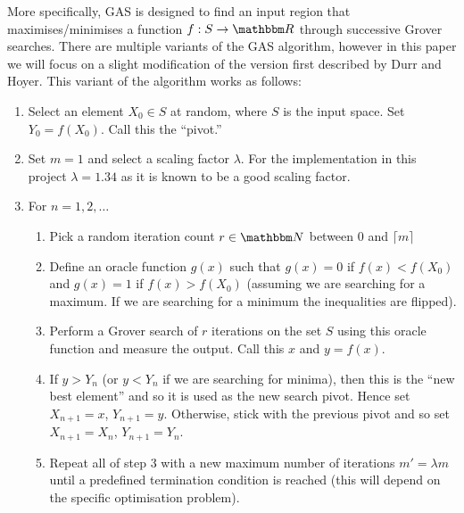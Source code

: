 \documentclass{article}[11pt]
\begin{document}
More specifically, GAS is designed to find an input region that maximises/minimises a function $f:S\rightarrow\mathbbm R$ through successive Grover searches. There are multiple variants of the GAS algorithm,\cite{baritompa} however in this paper we will focus on a slight modification of the version first described by Durr and Hoyer.\cite{durrhoyer,baritompa} This variant of the algorithm works as follows:
\begin{enumerate}
    \item Select an element $X_0\in S$ at random, where $S$ is the input space. Set $Y_0=f(X_0)$. Call this the ``pivot.''
    \item Set $m=1$ and select a scaling factor $\lambda$. For the implementation in this project $\lambda=1.34$ as it is known to be a good scaling factor.\cite{baritompa}
    \item For $n=1,2,\dots$
    \begin{enumerate}
        \item Pick a random iteration count $r\in\mathbbm N$ between $0$ and $\lceil m \rceil$
        \item Define an oracle function $g(x)$ such that $g(x)=0$ if $f(x)<f(X_0)$ and $g(x)=1$ if $f(x)>f(X_0)$ (assuming we are searching for a maximum. If we are searching for a minimum the inequalities are flipped).
        \item Perform a Grover search of $r$ iterations on the set $S$ using this oracle function and measure the output. Call this $x$ and $y=f(x)$.
        \item If $y>Y_n$ (or $y<Y_n$ if we are searching for minima), then this is the ``new best element'' and so it is used as the new search pivot. Hence set $X_{n+1}=x$, $Y_{n+1}=y$. Otherwise, stick with the previous pivot and so set $X_{n+1}=X_n$, $Y_{n+1}=Y_n$.
        \item Repeat all of step 3 with a new maximum number of iterations $m'=\lambda m$ until a predefined termination condition is reached (this will depend on the specific optimisation problem).
    \end{enumerate}
\end{enumerate}
\end{document}
